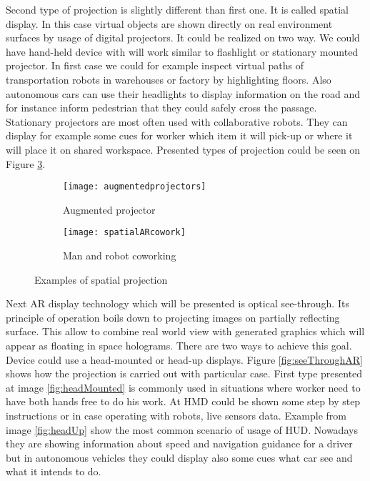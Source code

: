 \documentclass[printmode,en]{mgr}
\begin{document}
Second type of projection is slightly different than first one. It is called spatial display. In this case virtual objects are shown directly on real environment surfaces by usage of digital projectors. It could be realized on two way. We could have hand-held device with will work similar to flashlight or stationary mounted projector. In first case we could for example inspect virtual paths of transportation robots in warehouses or factory by highlighting floors. Also autonomous cars can use their headlights to display information on the road and for instance inform pedestrian that they could safely cross the passage. Stationary projectors are most often used with collaborative robots. They can display for example some cues for worker which item it will pick-up or where it will place it on shared workspace. Presented types of projection could be seen on Figure \ref{fig:spatialAR}.

\begin{figure}[!ht]
\centering
\begin{subfigure}{.4\textwidth}
  \centering
  \texttt{[image: augmentedprojectors]}
  \caption{Augmented projector \cite{augmentedprojectors}}
  \label{fig:augmentedprojectors}
\end{subfigure}%
\begin{subfigure}{.4\textwidth}
  \centering
  \texttt{[image: spatialARcowork]}
  \caption{Man and robot coworking \cite{SpatialARCollaborative}}
  \label{fig:spatialARcowork}
\end{subfigure}
\caption{Examples of spatial projection}
\label{fig:spatialAR}
\end{figure}

Next AR display technology which will be presented is optical see-through. Its principle of operation boils down to projecting images on partially reflecting surface. This allow to combine real world view with generated graphics which will appear as floating in space holograms. There are two ways to achieve this goal. Device could use a head-mounted or head-up displays. Figure \ref{fig:seeThroughAR} shows how the projection is carried out with particular case. First type presented at image \ref{fig:headMounted} is commonly used in situations where worker need to have both hands free to do his work. At HMD could be shown some step by step instructions or in case operating with robots, live sensors data. Example from image \ref{fig:headUp} show the most common scenario of usage of HUD. Nowadays they are showing information about speed and navigation guidance for a driver but in autonomous vehicles they could display also some cues what car see and what it intends to do.
\end{document}
